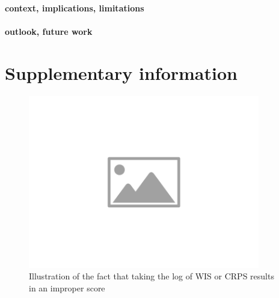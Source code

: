 \documentclass{article}
\begin{document}
\paragraph{context, implications, limitations}

\paragraph{outlook, future work}


 




\newpage

\appendix
\section{Supplementary information}

\begin{figure}[h!]
    \centering
    \includegraphics[width=0.9\textwidth]{output/placeholder-image.png}
    \caption{Illustration of the fact that taking the log of WIS or CRPS results in an improper score}
    \label{fig:log-improper}
\end{figure}
\end{document}
